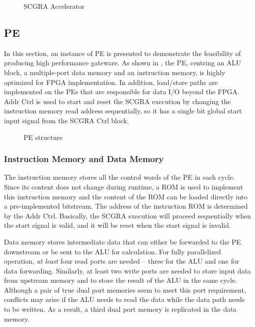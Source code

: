 \begin{figure}[h]
    \caption{SCGRA Accelerator}
    \label{fig:scgra-accelerator}
\end{figure}

\subsection{PE}
In this section, an instance of PE is presented to demonstrate the feasibility of producing high performance gateware. As shown in , the PE, centring an ALU block, a multiple-port data memory and an instruction memory, is highly optimized for FPGA implementation. In addition, load/store paths are implemented on the PEs that are responsible for data I/O beyond the FPGA. Addr Ctrl is used to start and reset the SCGRA execution by changing the instruction memory read address sequentially, so it has a single bit global start input signal from the SCGRA Ctrl block. 

\begin{figure}[h]
\center{\texttt{[image: pe]}}
\caption{PE structure}
\label{fig:pe}
\end{figure}

\subsubsection{Instruction Memory and Data Memory}
The instruction memory stores all the control words of the PE in each cycle. Since its content does not change during runtime, a ROM is used to implement this instruction memory and the content of the ROM can be loaded directly into a pre-implemented bitstream. The address of the instruction ROM is determined by the Addr Ctrl. Basically, the SCGRA execution will proceed sequentially when the start signal is valid, and it will be reset when the start signal is invalid.

Data memory stores intermediate data that can either be forwarded to the PE downstream or be sent to the ALU for calculation. For fully parallelized operation, \emph{at least} four read ports are needed -- three for the ALU and one for data forwarding. Similarly, at least two write ports are needed to store input data from upstream memory and to store the result of the ALU in the same cycle. Although a pair of true dual port memories seem to meet this port requirement, conflicts may arise if the ALU needs to read the data while the data path needs to be written. As a result, a third dual port memory is replicated in the data memory.

